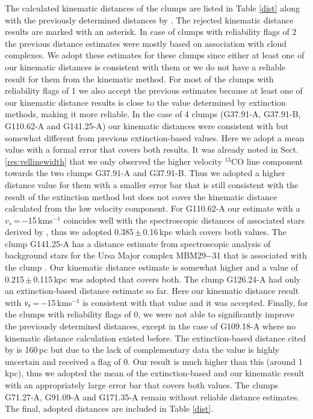 \documentclass[printer]{aa}
\begin{document}
The calculated kinematic distances of the clumps are listed in Table \ref{dist} along with the previously determined distances by \citet{montillaud2015}. The rejected kinematic distance results are marked with an asterisk. In case of clumps with reliability flags of 2 the previous distance estimates were mostly based on association with cloud complexes. We adopt these estimates for these clumps since either at least one of our kinematic distances is consistent with them or we do not have a reliable result for them from the kinematic method. For most of the clumps with reliability flags of 1 we also accept the previous estimates because at least one of our kinematic distance results is close to the value determined by extinction methods, making it more reliable. In the case of 4 clumps (G37.91-A, G37.91-B, G110.62-A and G141.25-A) our kinematic distances were consistent with but somewhat different from previous extinction-based values. Here we adopt a mean value with a formal error that covers both results. It was already noted in Sect. \ref{res:vellinewidth} that we only observed the higher velocity $^{13}$CO line component towards the two clumps G37.91-A and G37.91-B. Thus we adopted a higher distance value for them with a smaller error bar that is still consistent with the result of the extinction method but does not cover the kinematic distance calculated from the low velocity component. For G110.62-A our estimate with a $v_s$\,=\,$-$15\,kms$^{-1}$ coincides well with the spectroscopic distances of associated stars derived by \citet{aveni1969}, thus we adopted 0.385\,$\pm$\,0.16\,kpc which covers both values. The clump G141.25-A has a distance estimate from spectroscopic analysis of background stars for the Ursa Major complex MBM29$-$31 that is associated with the clump \citep{penprase1993}. Our kinematic distance estimate is somewhat higher and a value of 0.215\,$\pm$\,0.115\,kpc was adopted that covers both. The clump G126.24-A had only an extinction-based distance estimate so far. Here our kinematic distance result with $v_{\rm s}$\,=\,$-$15\,kms$^{-1}$ is consistent with that value and it was accepted. Finally, for the clumps with reliability flags of 0, we were not able to significantly improve the previously determined distances, except in the case of G109.18-A where no kinematic distance calculation existed before. The extinction-based distance cited by \citet{montillaud2015} is 160\,pc \citep{juvela2012} but due to the lack of complementary data the value is highly uncertain and received a flag of 0. Our result is much higher than this (around 1\,kpc), thus we adopted the mean of the extinction-based and our kinematic result with an appropriately large error bar that covers both values. The clumps G71.27-A, G91.09-A and G171.35-A remain without reliable distance estimates. The final, adopted distances are included in Table \ref{dist}.
\end{document}
